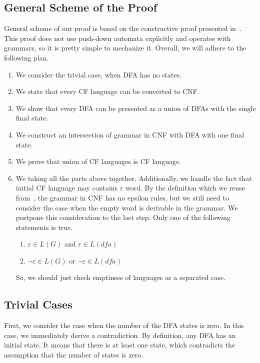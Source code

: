 \subsection{General Scheme of the Proof}

General scheme of our proof is based on the constructive proof presented in~\cite{beigelproof}.
This proof does not use push-down automata explicitly and operates with grammars, so it is pretty simple to mechanize it.
Overall, we will adhere to the following plan. 

\begin{enumerate}
    \item We consider the trivial case, when DFA has no states.
    \item We state that every CF language can be converted to CNF.
    \item We show that every DFA can be presented as a union of DFAs with the single final state.
    \item We construct an intersection of grammar in CNF with DFA with one final state.
    \item We prove that union of CF languages is CF language.
    \item We taking all the parts above together. 
	Additionally, we handle the fact that initial CF language may contains $\varepsilon$ word. By the definition which we reuse from~\cite{smolkaHofmann2016}, the grammar in CNF has no epsilon rules, but we still need to consider the case when the empty word is derivable in the grammar. We postpone this consideration to the last step. Only one of the following statements is true. 

\begin{enumerate}
	\item $\varepsilon \in L(G)$ and $\varepsilon \in L(\textit{dfa})$
	\item $\neg \varepsilon \in L(G)$ or $\neg \varepsilon \in L(\textit{dfa})$
\end{enumerate}

So, we should just check emptiness of languages as a separated case.

\end{enumerate}


\subsection{Trivial Cases}

First, we consider the case when the number of the DFA states is zero. 
In this case, we immediately derive a contradiction.
By definition, any DFA has an initial state. 
It means that there is at least one state, which contradicts the assumption that the number of states is zero.

